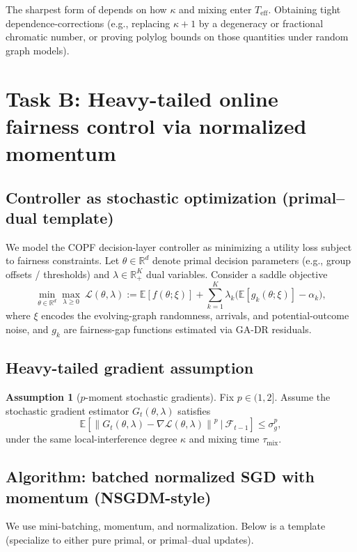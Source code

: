 \documentclass[11pt]{article}
\newcommand{\E}{\mathbb{E}}
\newcommand{\1}{\mathbf{1}}
\newcommand{\cF}{\mathcal{F}}
\newcommand{\R}{\mathbb{R}}
\newcommand{\norm}[1]{\left\|#1\right\|}
\theoremstyle{plain}
\theoremstyle{definition}
\newtheorem{assumption}[theorem]{Assumption}
\theoremstyle{remark}
\begin{document}
The sharpest form of  depends on how $\kappa$ and mixing enter $T_{\mathrm{eff}}$.
Obtaining tight dependence-corrections (e.g., replacing $\kappa+1$ by a degeneracy or fractional chromatic number,
or proving polylog bounds on those quantities under random graph models).

\section{Task B: Heavy-tailed online fairness control via normalized momentum}
\label{sec:B}

\subsection{Controller as stochastic optimization (primal--dual template)}
We model the COPF decision-layer controller as minimizing a utility loss subject to fairness constraints.
Let $\theta\in\R^d$ denote primal decision parameters (e.g., group offsets / thresholds) and $\lambda\in\R_+^K$ dual variables.
Consider a saddle objective
\[
\min_{\theta\in\R^d}\max_{\lambda\ge 0}\ \mathcal{L}(\theta,\lambda)
:= \E[f(\theta;\xi)] + \sum_{k=1}^K \lambda_k\bigl(\E[g_k(\theta;\xi)]-\alpha_k\bigr),
\]
where $\xi$ encodes the evolving-graph randomness, arrivals, and potential-outcome noise, and
$g_k$ are fairness-gap functions estimated via GA-DR residuals.

\subsection{Heavy-tailed gradient assumption}
\begin{assumption}[$p$-moment stochastic gradients]\label{ass:heavy_grad}
Fix $p\in(1,2]$.
Assume the stochastic gradient estimator $G_t(\theta,\lambda)$ satisfies
\[
\E\!\left[\norm{G_t(\theta,\lambda)-\nabla \mathcal{L}(\theta,\lambda)}^p\ \big|\ \cF_{t-1}\right]\le \sigma_g^p,
\]
under the same local-interference degree $\kappa$ and mixing time $\tau_{\mathrm{mix}}$.
\end{assumption}

\subsection{Algorithm: batched normalized SGD with momentum (NSGDM-style)}
We use mini-batching, momentum, and normalization.
Below is a template (specialize to either pure primal, or primal--dual updates).
\end{document}

